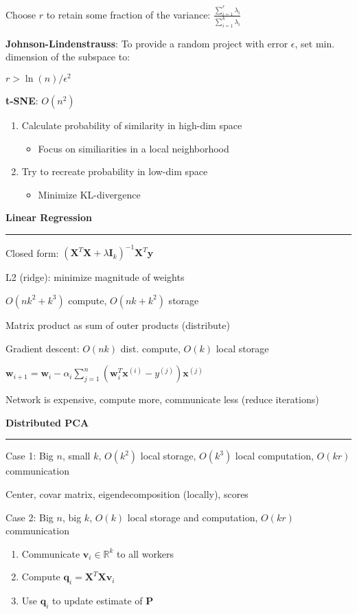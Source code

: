 \documentclass[8pt,letter,landscape]{article}
\newcommand{\sectiontitle}[1]{\textbf{\large #1}\vspace{0.2em}\hrule\vspace{0.5em}}
\begin{document}
\begin{multicols*}{3}
Choose $r$ to retain some fraction of the variance: $\frac{\sum_{i = 1}^r \lambda_i}{\sum_{i = 1}^k \lambda_i}$

\textbf{Johnson-Lindenstrauss}: To provide a random project with error $\epsilon$, set min. dimension of the subspace to:

$r > \ln(n)/ \epsilon^2$

\textbf{t-SNE}: $O(n^2)$
\begin{enumerate}[leftmargin=*,nosep]
    \item Calculate probability of similarity in high-dim space
    \begin{itemize}[leftmargin=*,nosep]
        \item Focus on similiarities in a local neighborhood
    \end{itemize}
    \item Try to recreate probability in low-dim space
    \begin{itemize}[leftmargin=*,nosep]
        \item Minimize KL-divergence
    \end{itemize}
\end{enumerate}

\sectiontitle{Linear Regression}
Closed form: $(\mathbf{X}^T \mathbf{X} + \lambda \mathbf{I}_k)^{-1} \mathbf{X}^T \mathbf{y}$

L2 (ridge): minimize magnitude of weights

$O(nk^2 + k^3)$ compute, $O(nk + k^2)$ storage

Matrix product as sum of outer products (distribute)

Gradient descent: $O(nk)$ dist. compute, $O(k)$ local storage

$\mathbf{w}_{i + 1} = \mathbf{w}_i - \alpha_i \sum_{j = 1}^n (\mathbf{w}_i^T \mathbf{x}^{(i)} - y^{(j)}) \mathbf{x}^{(j)}$

Network is expensive, compute more, communicate less (reduce iterations)

\sectiontitle{Distributed PCA}
Case 1: Big $n$, small $k$, $O(k^2)$ local storage, $O(k^3)$ local computation, $O(kr)$ communication

Center, covar matrix, eigendecomposition (locally), scores

Case 2: Big $n$, big $k$, $O(k)$ local storage and computation, $O(kr)$ communication
\begin{enumerate}[leftmargin=*,nosep]
    \item Communicate $\mathbf{v}_i \in \mathbb{R}^k$ to all workers
    \item Compute $\mathbf{q}_i = \mathbf{X}^T \mathbf{Xv}_i$
    \item Use $\mathbf{q}_i$ to update estimate of $\mathbf{P}$
\end{enumerate}


\end{multicols*}
\end{document}
